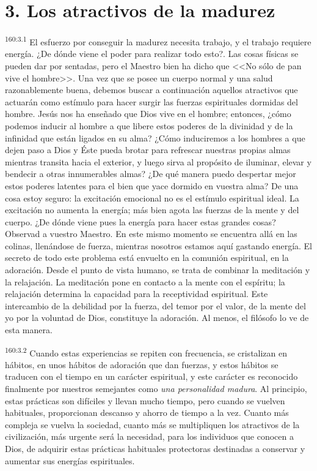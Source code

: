 \section*{3. Los atractivos de la madurez}
\par 
\textsuperscript{160:3.1} El esfuerzo por conseguir la madurez necesita trabajo, y el trabajo requiere energía. ¿De dónde viene el poder para realizar todo esto?. Las cosas físicas se pueden dar por sentadas, pero el Maestro bien ha dicho que <<No sólo de pan vive el hombre>>. Una vez que se posee un cuerpo normal y una salud razonablemente buena, debemos buscar a continuación aquellos atractivos que actuarán como estímulo para hacer surgir las fuerzas espirituales dormidas del hombre. Jesús nos ha enseñado que Dios vive en el hombre; entonces, ¿cómo podemos inducir al hombre a que libere estos poderes de la divinidad y de la infinidad que están ligados en su alma? ¿Cómo induciremos a los hombres a que dejen paso a Dios y Éste pueda brotar para refrescar nuestras propias almas mientras transita hacia el exterior, y luego sirva al propósito de iluminar, elevar y bendecir a otras innumerables almas? ¿De qué manera puedo despertar mejor estos poderes latentes para el bien que yace dormido en vuestra alma? De una cosa estoy seguro: la excitación emocional no es el estímulo espiritual ideal. La excitación no aumenta la energía; más bien agota las fuerzas de la mente y del cuerpo. ¿De dónde viene pues la energía para hacer estas grandes cosas? Observad a vuestro Maestro. En este mismo momento se encuentra allá en las colinas, llenándose de fuerza, mientras nosotros estamos aquí gastando energía. El secreto de todo este problema está envuelto en la comunión espiritual, en la adoración. Desde el punto de vista humano, se trata de combinar la meditación y la relajación. La meditación pone en contacto a la mente con el espíritu; la relajación determina la capacidad para la receptividad espiritual. Este intercambio de la debilidad por la fuerza, del temor por el valor, de la mente del yo por la voluntad de Dios, constituye la adoración. Al menos, el filósofo lo ve de esta manera.

\par 
\textsuperscript{160:3.2} Cuando estas experiencias se repiten con frecuencia, se cristalizan en hábitos, en unos hábitos de adoración que dan fuerzas, y estos hábitos se traducen con el tiempo en un carácter espiritual, y este carácter es reconocido finalmente por nuestros semejantes como \textit{una personalidad madura}. Al principio, estas prácticas son difíciles y llevan mucho tiempo, pero cuando se vuelven habituales, proporcionan descanso y ahorro de tiempo a la vez. Cuanto más compleja se vuelva la sociedad, cuanto más se multipliquen los atractivos de la civilización, más urgente será la necesidad, para los individuos que conocen a Dios, de adquirir estas prácticas habituales protectoras destinadas a conservar y aumentar sus energías espirituales.

